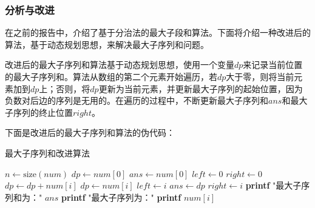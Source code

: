 \documentclass[lang=cn,11pt,a4paper]{elegantpaper}
\begin{document}
\subsubsection{分析与改进}

在之前的报告中，介绍了基于分治法的最大子段和算法。下面将介绍一种改进后的算法，基于动态规划思想，来解决最大子序列和问题。

改进后的最大子序列和算法基于动态规划思想，使用一个变量$dp$来记录当前位置的最大子序列和。算法从数组的第二个元素开始遍历，若$dp$大于零，则将当前元素加到$dp$上；否则，将$dp$更新为当前元素，并更新最大子序列的起始位置，因为负数对后边的序列是无用的。在遍历的过程中，不断更新最大子序列和$ans$和最大子序列的终止位置$right$。

下面是改进后的最大子序列和算法的伪代码：

\begin{algorithm}[H]
\caption{最大子序列和改进算法}
\begin{algorithmic}[1]
    \State $n \gets \text{size}(num)$
    \State $dp \gets num[0]$
    \State $ans \gets num[0]$
    \State $left \gets 0$
    \State $right \gets 0$
    \State $dp \gets dp + num[i]$
    \Else
    \State $dp \gets num[i]$
    \State $left \gets i$
    \EndIf
    \State $ans \gets dp$
    \State $right \gets i$
    \EndIf
    \EndFor
    \State \textbf{printf} "最大子序列和为：" $ans$
    \State \textbf{printf} "最大子序列为："
    \State \textbf{printf} $num[i]$
    \EndFor
\EndProcedure
\end{algorithmic}
\end{algorithm}
\end{document}
